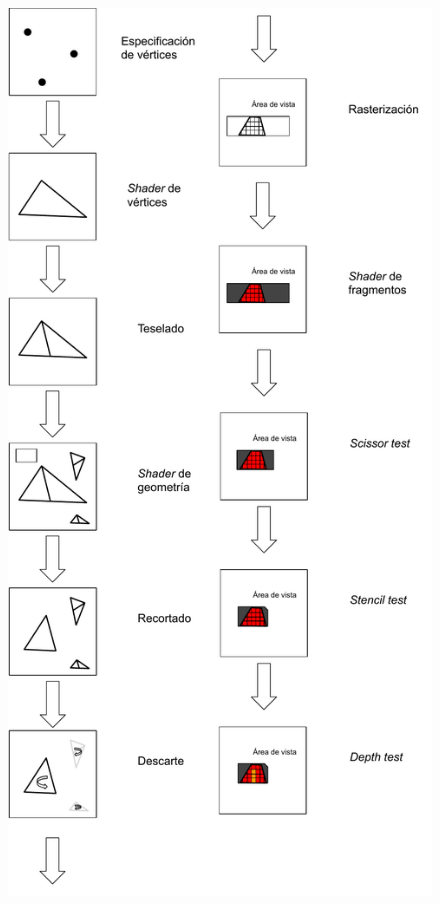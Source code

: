 \vspace{5mm}
\begin{figure}[H]
	\centering
	\includegraphics[width=0.55\linewidth]{assets/OpenGL}
	\label{img:pipelinegl}
\end{figure}
